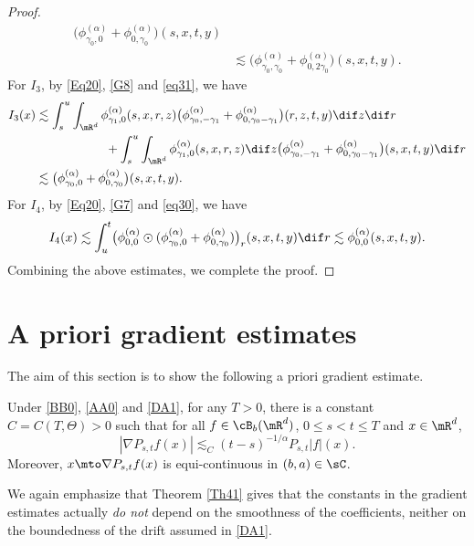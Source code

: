 \begin{proof}
\begin{align*}
\bigl(\phi^{(\alpha)}_{\gamma_0,0}+\phi^{(\alpha)}_{0,\gamma_0}\bigr)(s,x,t,y)
\\&\lesssim\bigl(\phi^{(\alpha)}_{\gamma_0,\gamma_0}+\phi^{(\alpha)}_{0,2\gamma_0}\bigr)(s,x,t,y).
\end{align*}
For $I_3$, by {\eqref{Eq20}}, \eqref{G8} and \eqref{eq31}, we have
\begin{align*}
I_3(x)&\lesssim\int^u_s\int_{\mR^d}\phi^{(\alpha)}_{\gamma_1,0}(s,x,r,z)\bigl(\phi^{(\alpha)}_{\gamma_0,-\gamma_1}
+\phi^{(\alpha)}_{0,\gamma_0-\gamma_1}\bigr)(r,z,t,y)\dif z\dif r\\
&\hspace*{2cm}+\int^u_s\int_{\mR^d}\phi^{(\alpha)}_{\gamma_1,0}(s,x,r,z)\dif z
\bigl(\phi^{(\alpha)}_{\gamma_0,-\gamma_1}
+\phi^{(\alpha)}_{0,\gamma_0-\gamma_1}\bigr)(s,x,t,y)\dif r\\
&\lesssim \bigl(\phi^{(\alpha)}_{\gamma_0,0}+\phi^{(\alpha)}_{0,\gamma_0}\bigr)(s,x,t,y).
\end{align*}
For $I_4$, by \eqref{Eq20}, \eqref{G7} and \eqref{eq30}, we have
\begin{equation*}
I_4(x)\lesssim\int^t_u\bigl(\phi^{(\alpha)}_{0,0}\odot(\phi^{(\alpha)}_{\gamma_0,0}
+\phi^{(\alpha)}_{0,\gamma_0})\bigr)_r(s,x,t,y)\dif r\lesssim\phi^{(\alpha)}_{0,0}(s,x,t,y).
\end{equation*}
Combining the above estimates, we complete the proof.
\end{proof}

\section{A priori gradient estimates}\label{SEC_GRAD}

The aim of this section is to show the following a priori gradient estimate.
\begin{theorem}\label{Th41}
Under \eqref{BB0}, \eqref{AA0} and \eqref{DA1}, for any $T>0$, there is a constant $C=C(T,\Theta)>0$ such that
for all $f\in \cB_b(\mR^d)$,
$0\leq s<t\leq T$ and $x\in\mR^d$,
\begin{equation}\label{DQ1}
|\nabla P_{s,t}f(x)|\lesssim_C (t-s)^{-1/\alpha}P_{s,t}|f|(x).
\end{equation}
Moreover, $x\mto \nabla P_{s,t}f(x)$ is equi-continuous in $(b,a)\in\sC$.
\end{theorem}
{We again emphasize that Theorem \ref{Th41} gives that the constants in the gradient estimates actually \emph{do not} depend on the smoothness of the coefficients, neither on the boundedness of the drift assumed in \eqref{DA1}}.

